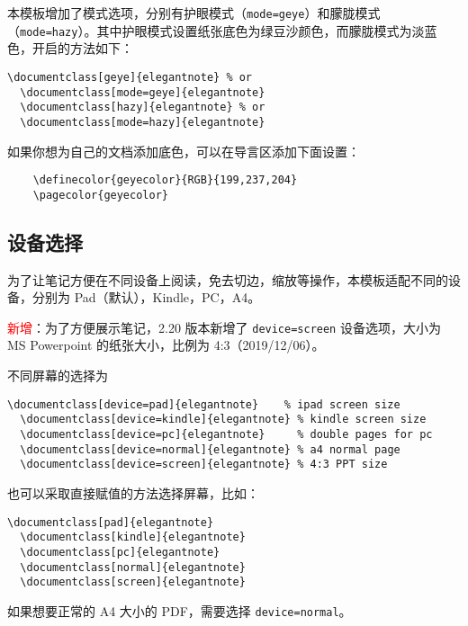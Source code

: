 \documentclass[cn,hazy,blue,14pt,screen]{elegantnote}
\begin{document}
本模板增加了模式选项，分别有护眼模式（\lstinline{mode=geye}）和朦胧模式（\lstinline{mode=hazy}）。其中护眼模式设置纸张底色为绿豆沙颜色，而朦胧模式为淡蓝色，开启的方法如下：
\begin{lstlisting}[frame=none]  
  \documentclass[geye]{elegantnote} % or
  \documentclass[mode=geye]{elegantnote}
  \documentclass[hazy]{elegantnote} % or
  \documentclass[mode=hazy]{elegantnote}
\end{lstlisting}

\begin{remark}
    如果你想为自己的文档添加底色，可以在导言区添加下面设置：
    \begin{lstlisting}
    \definecolor{geyecolor}{RGB}{199,237,204}
    \pagecolor{geyecolor}
  \end{lstlisting}
\end{remark}


\subsection{设备选择}

为了让笔记方便在不同设备上阅读，免去切边，缩放等操作，本模板适配不同的设备，分别为 Pad（默认），Kindle，PC，A4。

\textcolor{red}{\kaishu 新增}：为了方便展示笔记，2.20 版本新增了 \lstinline{device=screen} 设备选项，大小为 MS Powerpoint 的纸张大小，比例为 4:3（2019/12/06）。

不同屏幕的选择为
\begin{lstlisting}[frame=none]  
  \documentclass[device=pad]{elegantnote}    % ipad screen size
  \documentclass[device=kindle]{elegantnote} % kindle screen size
  \documentclass[device=pc]{elegantnote}     % double pages for pc 
  \documentclass[device=normal]{elegantnote} % a4 normal page
  \documentclass[device=screen]{elegantnote} % 4:3 PPT size
\end{lstlisting}
\begin{note}
    也可以采取直接赋值的方法选择屏幕，比如：
\end{note}
\begin{lstlisting}[frame=none]  
  \documentclass[pad]{elegantnote}
  \documentclass[kindle]{elegantnote}
  \documentclass[pc]{elegantnote}
  \documentclass[normal]{elegantnote}
  \documentclass[screen]{elegantnote}
\end{lstlisting}

\begin{note}
    如果想要正常的 A4 大小的 PDF，需要选择 \lstinline{device=normal}。
\end{note}
\end{document}
